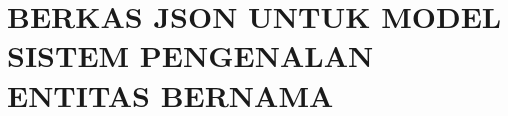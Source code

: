 \documentclass[ugmskripsi]{ugmskripsi}
\begin{document}



\appendix

\chapter{BERKAS JSON UNTUK MODEL SISTEM PENGENALAN ENTITAS BERNAMA}
\label{BERKAS JSON UNTUK MODEL SISTEM PENGENALAN ENTITAS BERNAMA}


\end{document}
